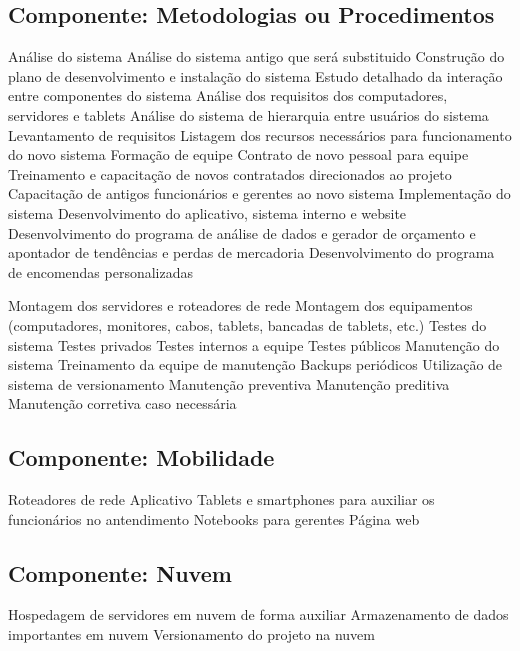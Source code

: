      \subsection{Componente: Metodologias ou Procedimentos}
	\begin{outline}
	\1 An\'{a}lise do sistema
		\2 An\'{a}lise do sistema antigo que será substituido
		\2 Construção do plano de desenvolvimento e instalação do sistema
		\2 Estudo detalhado da interação entre componentes do sistema
		\2 An\'{a}lise dos requisitos dos computadores, servidores e tablets
		\2 An\'{a}lise do sistema de hierarquia entre usuários do sistema
	\1 Levantamento de requisitos
		\2 Listagem dos recursos necessários para funcionamento do novo sistema
	\1 Formação de equipe
		\2 Contrato de novo pessoal para equipe 
		\2 Treinamento e capacitação de novos contratados direcionados ao projeto
		\2 Capacitação de antigos funcionários e gerentes ao novo sistema
	\1 Implementação do sistema
		\2 Desenvolvimento do aplicativo, sistema interno e website
		\2 Desenvolvimento do programa de análise de dados e gerador de orçamento e apontador de tendências e perdas de mercadoria
		\2 Desenvolvimento do programa de encomendas personalizadas
		
		\2 Montagem dos servidores e roteadores de rede
		\2 Montagem dos equipamentos (computadores, monitores, cabos, tablets, bancadas de tablets, etc.)
	\1 Testes do sistema
		\2 Testes privados
		\2 Testes internos a equipe
		\2 Testes públicos
	\1 Manutenção do sistema
		\2 Treinamento da equipe de manutenção
		\2 Backups periódicos 
		\2 Utilização de sistema de versionamento
		\2 Manutenção preventiva
		\2 Manutenção preditiva
		\2 Manutenção corretiva caso necessária
	\end{outline}
     \subsection{Componente: Mobilidade}
	\begin{outline}
	\1 Roteadores de rede
	\1 Aplicativo
	\1 Tablets e smartphones para auxiliar os funcionários no antendimento
	\1 Notebooks para gerentes 
	\1 P\'{a}gina web
	\end{outline}
     \subsection{Componente: Nuvem}
	\begin{outline}
	\1 Hospedagem de servidores em nuvem de forma auxiliar  
	\1 Armazenamento de dados importantes em nuvem
	\1 Versionamento do projeto na nuvem
	\end{outline}
